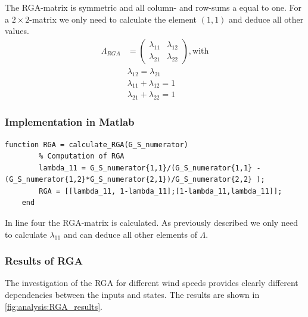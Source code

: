 The RGA-matrix is symmetric and all column- and row-sums a equal to one.
For a $2\times2$-matrix we only need to calculate the element $(1,1)$ and deduce all other values.
\begin{align}
    \Lambda_{RGA} &= \begin{pmatrix}
        \lambda_{11} & \lambda_{12} \\
        \lambda_{21} & \lambda_{22}
    \end{pmatrix}, \text{with} \\
    & \lambda_{12} = \lambda_{21} \\
    & \lambda_{11} + \lambda_{12} = 1 \\
    & \lambda_{21} + \lambda_{22} = 1
\end{align}


\subsubsection*{Implementation in Matlab}


\begin{lstlisting}[style=Matlab-editor,caption={This Matlab function calculates a $2\times2$-RGA-matrix},captionpos=b,label={list:analysis:RGA}]
    function RGA = calculate_RGA(G_S_numerator)
        % Computation of RGA
        lambda_11 = G_S_numerator{1,1}/(G_S_numerator{1,1} - (G_S_numerator{1,2}*G_S_numerator{2,1})/G_S_numerator{2,2} );
        RGA = [[lambda_11, 1-lambda_11];[1-lambda_11,lambda_11]];
    end
\end{lstlisting}
    
In line four the RGA-matrix is calculated.
As previously described we only need to calculate  $\lambda_{11}$ and can deduce all other elements of $\Lambda$.

    

\subsubsection*{Results of RGA}

The investigation of the RGA for different wind speeds provides clearly different dependencies between the inputs and states.
The results are shown in \autoref{fig:analysis:RGA_results}.

